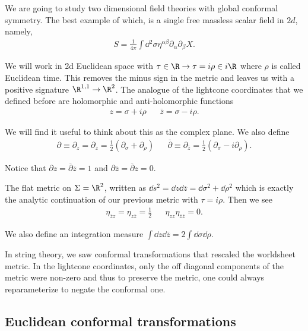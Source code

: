 
We are going to study two dimensional field theories with global conformal symmetry. The best example of which, is a single free massless scalar field in $2d$, namely,
\begin{align}
    S = \frac{1}{4\pi} \int \dd{^2 \sigma} \eta^{\alpha \beta} \partial_\alpha \partial_\beta X
.\end{align}

We will work in 2d Euclidean space with $\tau \in \R \to \tau = i \rho \in i \R$ where $\rho$ is called Euclidean time. This removes the minus sign in the metric and leaves us with a positive signature $\R^{1,1} \to \R^2$. The analogue of the lightcone coordinates that we defined before are holomorphic and anti-holomorphic functions
\begin{align}
    z = \sigma + i \rho && \overline{z} = \sigma - i \rho
.\end{align}

We will find it useful to think about this as the complex plane. We also define
\begin{align}
    \partial \equiv \partial_z = \partial_z = \frac{1}{2} \left( \partial_\sigma + \partial_\rho \right) && \overline{\partial} \equiv \partial_{\overline{z}} = \frac{1}{2} \left( \partial_\sigma -i \partial_\rho \right) 
.\end{align}

Notice that $\partial z = \overline{\partial} \overline{z} = 1$ and $\partial \overline{z} = \overline{\partial} z = 0$.

The flat metric on $\Sigma = \R^2$, written as $\dd{s}^2 = \dd{z} \dd{\overline{z}} = \dd{\sigma}^2 + \dd{\rho}^2$ which is exactly the analytic continuation of our previous metric with $\tau = i \rho$. Then we see
\begin{align}
    \eta_{\overline{z} z} = \eta_{z\overline{z}} = \frac{1}{2} && \eta_{z z} \eta_{\overline{z} \overline{z}} = 0
.\end{align}

We also define an integration measure $\int \dd{z} \dd{\overline{z}} = 2 \int \dd{\sigma} \dd{\rho}$.

In string theory, we saw conformal transformations that rescaled the worldsheet metric. In the lightcone coordinates, only the off diagonal components of the metric were non-zero and thus to preserve the metric, one could always reparameterize to negate the conformal one.

\subsection{Euclidean conformal transformations}

